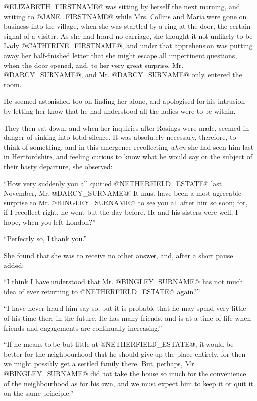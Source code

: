 @ELIZABETH_FIRSTNAME@ was sitting by herself the next morning, and writing to @JANE_FIRSTNAME@
while Mrs. Collins and Maria were gone on business into the village,
when she was startled by a ring at the door, the certain signal of a
visitor. As she had heard no carriage, she thought it not unlikely to
be Lady @CATHERINE_FIRSTNAME@, and under that apprehension was putting away her
half-finished letter that she might escape all impertinent questions,
when the door opened, and, to her very great surprise, Mr. @DARCY_SURNAME@, and
Mr. @DARCY_SURNAME@ only, entered the room.

He seemed astonished too on finding her alone, and apologised for his
intrusion by letting her know that he had understood all the ladies were
to be within.

They then sat down, and when her inquiries after Rosings were made,
seemed in danger of sinking into total silence. It was absolutely
necessary, therefore, to think of something, and in this emergence
recollecting \textit{when} she had seen him last in Hertfordshire, and
feeling curious to know what he would say on the subject of their hasty
departure, she observed:

``How very suddenly you all quitted @NETHERFIELD_ESTATE@ last November, Mr. @DARCY_SURNAME@!
It must have been a most agreeable surprise to Mr. @BINGLEY_SURNAME@ to see you
all after him so soon; for, if I recollect right, he went but the day
before. He and his sisters were well, I hope, when you left London?''

``Perfectly so, I thank you.''

She found that she was to receive no other answer, and, after a short
pause added:

``I think I have understood that Mr. @BINGLEY_SURNAME@ has not much idea of ever
returning to @NETHERFIELD_ESTATE@ again?''

``I have never heard him say so; but it is probable that he may spend
very little of his time there in the future. He has many friends, and
is at a time of life when friends and engagements are continually
increasing.''

``If he means to be but little at @NETHERFIELD_ESTATE@, it would be better for
the neighbourhood that he should give up the place entirely, for then we
might possibly get a settled family there. But, perhaps, Mr. @BINGLEY_SURNAME@ did
not take the house so much for the convenience of the neighbourhood as
for his own, and we must expect him to keep it or quit it on the same
principle.''

